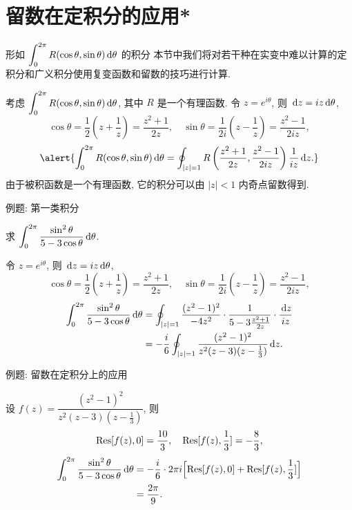 \section{留数在定积分的应用*}


\begin{frame}{形如 $\displaystyle\int_0^{2\pi} R(\cos\theta,\sin\theta)\,\mathrm{d}\theta$ 的积分}
\onslide<+->
本节中我们将对若干种在实变中难以计算的定积分和广义积分使用复变函数和留数的技巧进行计算.

\onslide<+->
考虑 $\displaystyle\int_0^{2\pi} R(\cos\theta,\sin\theta)\,\mathrm{d}\theta$, 其中 $R$ 是一个有理函数.
\onslide<+->
令 $z=e^{i\theta}$, 则 $\,\mathrm{d} z=iz\,\mathrm{d}\theta$,
\onslide<+->
\[\cos\theta=\frac12\left(z+\frac1z\right)=\frac{z^2+1}{2z},\quad
\sin\theta=\frac1{2i}\left(z-\frac1z\right)=\frac{z^2-1}{2iz},\]
\onslide<+->
\[\alert{\int_0^{2\pi} R(\cos\theta,\sin\theta)\diff\theta=\oint_{|z|=1}R\left(\frac{z^2+1}{2z},\frac{z^2-1}{2iz}\right)\frac1{iz}\diff z.}\]
\onslide<+->
由于被积函数是一个有理函数, 它的积分可以由 $|z|<1$ 内奇点留数得到.
\end{frame}


\begin{frame}{例题: 第一类积分}
\begin{example}
求 $\displaystyle\int_0^{2\pi}\frac{\sin^2\theta}{5-3\cos\theta}\,\mathrm{d}\theta$.
\end{example}

\begin{solution}
令 $z=e^{i\theta}$, 则 $\,\mathrm{d} z=iz\,\mathrm{d}\theta$,
\onslide<+->
\[\cos\theta=\frac12\left(z+\frac1z\right)=\frac{z^2+1}{2z},\quad
\sin\theta=\frac1{2i}\left(z-\frac1z\right)=\frac{z^2-1}{2iz},\]
\vspace{-0.5\baselineskip}
\onslide<+->
\begin{align*}
\int_0^{2\pi}\frac{\sin^2\theta}{5-3\cos\theta}\,\mathrm{d}\theta
&=\oint_{|z|=1}\frac{(z^2-1)^2}{-4z^2}\cdot\frac1{5-3\frac{z^2+1}{2z}}\cdot\frac{\,\mathrm{d} z}{iz}\\
&=-\frac i6\oint_{|z|=1}\frac{(z^2-1)^2}{z^2(z-3)(z-\frac13)}\,\mathrm{d} z.
\end{align*}
\end{solution}
\end{frame}


\begin{frame}{例题: 留数在定积分上的应用}
\begin{solutionc}
设 $f(z)=\dfrac{(z^2-1)^2}{z^2(z-3)(z-\frac13)}$,
\onslide<+->
则
\[{\mathrm{Res}}[f(z),0]=\frac{10}3,\quad
{\mathrm{Res}}[f(z),\frac13]=-\frac83,\]
\onslide<+->
\begin{align*}
\int_0^{2\pi}\frac{\sin^2\theta}{5-3\cos\theta}\,\mathrm{d}\theta
&=-\frac i6\cdot 2\pi i\Bigl[{\mathrm{Res}}[f(z),0]+{\mathrm{Res}}[f(z),\frac13]\Bigr]\\
&=\frac{2\pi}9.
\end{align*}
\end{solutionc}
\end{frame}


